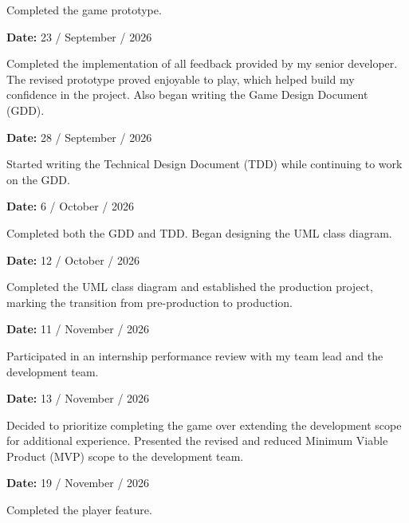 \noindent
Completed the game prototype.

\vspace{1.5em}

\noindent
\textbf{Date:} 23 / September / 2026
\vspace{0.5em}

\noindent
Completed the implementation of all feedback provided by my senior
developer. The revised prototype proved enjoyable to play, which
helped build my confidence in the project. Also began writing the
Game Design Document (GDD).

\vspace{1.5em}

\noindent
\textbf{Date:} 28 / September / 2026
\vspace{0.5em}

\noindent
Started writing the Technical Design Document (TDD) while continuing
to work on the GDD.

\vspace{1.5em}

\noindent
\textbf{Date:} 6 / October / 2026
\vspace{0.5em}

\noindent
Completed both the GDD and TDD. Began designing the UML class diagram.

\vspace{1.5em}

\noindent
\textbf{Date:} 12 / October / 2026
\vspace{0.5em}

\noindent
Completed the UML class diagram and established the production project,
marking the transition from pre-production to production.

\vspace{1.5em}

\noindent
\textbf{Date:} 11 / November / 2026
\vspace{0.5em}

\noindent
Participated in an internship performance review with my team lead
and the development team.

\vspace{1.5em}

\noindent
\textbf{Date:} 13 / November / 2026
\vspace{0.5em}

\noindent
Decided to prioritize completing the game over extending the development
scope for additional experience. Presented the revised and reduced
Minimum Viable Product (MVP) scope to the development team.

\vspace{1.5em}

\noindent
\textbf{Date:} 19 / November / 2026
\vspace{0.5em}

\noindent
Completed the player feature.
